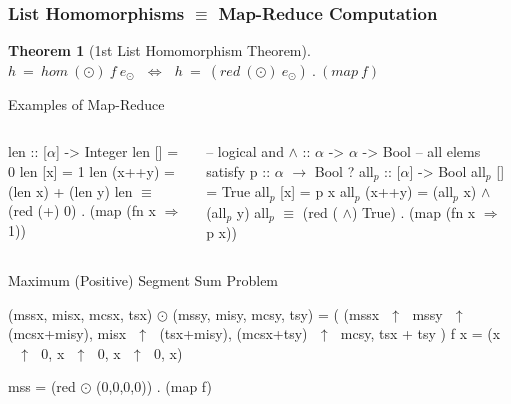\documentclass{beamer}
\renewcommand{\emph}[1]{\textcolor{structure}{#1}}
\newcommand{\emp}[1]{\textcolor{DikuRed}{ #1}}
\newcommand{\mymath}[1]{$ #1 $}
\newcommand{\myindx}[1]{_{#1}}
\newtheorem{mytheo}{Theorem}
\begin{document}
\begin{frame}[fragile,t]
  \frametitle{List Homomorphisms $\equiv$ Map-Reduce Computation}

\begin{mytheo}[1st List Homomorphism Theorem]\label{LHomLema}
\emp{$h~=~hom~(\odot)~f~e_{\odot}~~~\Leftrightarrow~~~h~=~(red~(\odot)~e_{\odot})~.~(map~f)$}
\end{mytheo}

\begin{block}{Examples of Map-Reduce}
\begin{columns}
\vspace{-2ex}
\begin{colorcode}[fontsize=\scriptsize]
\emph{len} :: [\mymath{\alpha}] -> Integer
\emph{len} []     = \emp{0}
\emph{len} [x]    = \emp{1}
\emph{len} (x++y) = (\emph{len} x) \emp{+} 
             (\emph{len} y)
\emp{len \mymath{\equiv} (red (+) 0) .}
       \emp{(map (fn x \mymath{\Rightarrow} 1))}
\end{colorcode}
\vspace{-2ex}
\begin{colorcode}[fontsize=\scriptsize]
-- logical and \emp{\mymath{\wedge}} :: \mymath{\alpha} -> \mymath{\alpha} -> Bool 
-- all elems satisfy p :: \mymath{\alpha} \mymath{\rightarrow} Bool ?
\emph{all\mymath{\myindx{p}}} :: [\mymath{\alpha}] -> Bool
\emph{all\mymath{\myindx{p}}} []     = \emp{True}
\emph{all\mymath{\myindx{p}}} [x]    = \emp{p x} 
\emph{all\mymath{\myindx{p}}} (x++y) = (\emph{all\mymath{\myindx{p}}} x) \emp{\mymath{\wedge}} (\emph{all\mymath{\myindx{p}}} y)
\emp{all\mymath{\myindx{p}} \mymath{\equiv} (red (\emp{\mymath{\wedge}}) True) .} \emp{(map (fn x \mymath{\Rightarrow} p x))}
\end{colorcode}
\end{columns}
\end{block}


\begin{block}{Maximum (Positive) Segment Sum Problem}
\begin{colorcode}
(mssx, misx, mcsx, tsx) \mymath{\odot} (mssy, misy, mcsy, tsy) = 
  ( (mssx\mymath{\mbox{ }\uparrow\mbox{ }}mssy\mymath{\mbox{ }\uparrow\mbox{ }}(mcsx+misy), misx\mymath{\mbox{ }\uparrow\mbox{ }}(tsx+misy), 
    (mcsx+tsy)\mymath{\mbox{ }\uparrow\mbox{ }}mcsy, tsx + tsy )
f x = (x\mymath{\mbox{ }\uparrow\mbox{ }}0, x\mymath{\mbox{ }\uparrow\mbox{ }}0, x\mymath{\mbox{ }\uparrow\mbox{ }}0, x)

\emph{mss = (red \mymath{\odot} (0,0,0,0)) . (map f)}
\end{colorcode}
\end{block}


\end{frame}
\end{document}
